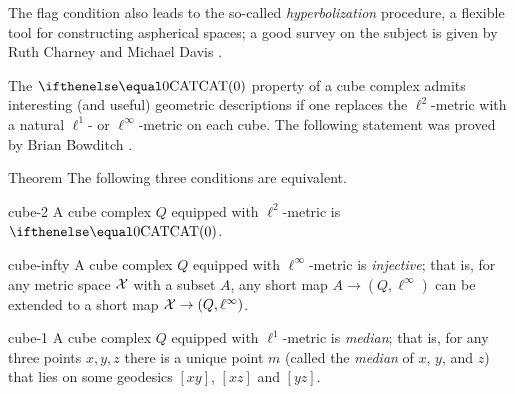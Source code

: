 The flag condition also leads to the so-called {}\emph{hyperbolization} procedure, a flexible tool for constructing  aspherical spaces;
a good survey on the subject is given by Ruth Charney and Michael Davis \cite{charney-davis-1995}.

The $\CAT0$ property of a cube complex admits interesting (and useful) geometric descriptions if one replaces the $\ell^2$-metric with a natural $\ell^1$- or $\ell^\infty$-metric on each cube.
The following statement was proved by Brian Bowditch \cite{bowditch-2020}.

\begin{thm}{Theorem}
The following three conditions are equivalent.

\begin{subthm}{cube-2} A cube complex $Q$ equipped with  $\ell^2$-metric is $\CAT0$.
\end{subthm}

\begin{subthm}{cube-infty} A cube complex $Q$ equipped with $\ell^\infty$-metric is \emph{injective}; that is, for any metric space $\mathcal{X}$ with a subset $A$, any short map $A\to (Q,\ell^\infty)$ can be extended to a short map $\spc{X}\to (Q,\ell^\infty)$.
\end{subthm}

\begin{subthm}{cube-1} A cube complex $Q$ equipped with $\ell^1$-metric is \emph{median}; that is, for any three points $x,y,z$ there is a unique point   $m$ (called the  \emph{median} of $x$, $y$, and $z$) that lies on some geodesics $[xy]$, $[xz]$ and $[yz]$.
\end{subthm}
\end{thm}
